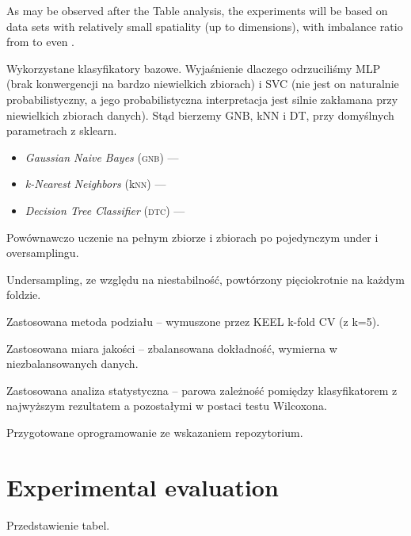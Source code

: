 \documentclass[pmlr]{jmlr}
\begin{document}
As may be observed after the Table analysis, the experiments will be based on data sets with relatively small spatiality (up to  dimensions), with imbalance ratio from  to even .

Wykorzystane klasyfikatory bazowe. Wyjaśnienie dlaczego odrzuciliśmy MLP (brak konwergencji na bardzo niewielkich zbiorach) i SVC (nie jest on naturalnie probabilistyczny, a jego probabilistyczna interpretacja jest silnie zakłamana przy niewielkich zbiorach danych). Stąd bierzemy GNB, kNN i DT, przy domyślnych parametrach z sklearn.

\begin{itemize}
	\item \emph{Gaussian Naive Bayes} (\textsc{gnb}) ---
	\item \emph{k-Nearest Neighbors} (k\textsc{nn}) ---
	\item \emph{Decision Tree Classifier} (\textsc{dtc}) ---
\end{itemize}

Powównawczo uczenie na pełnym zbiorze i zbiorach po pojedynczym under i oversamplingu.

Undersampling, ze względu na niestabilność, powtórzony pięciokrotnie na każdym foldzie.

Zastosowana metoda podziału -- wymuszone przez KEEL k-fold CV (z k=5). 

Zastosowana miara jakości -- zbalansowana dokładność, wymierna w niezbalansowanych danych.

Zastosowana analiza statystyczna -- parowa zależność pomiędzy klasyfikatorem z najwyższym rezultatem a pozostałymi w postaci testu Wilcoxona.

Przygotowane oprogramowanie ze wskazaniem repozytorium.

\section{Experimental evaluation}
\label{sec:intro}

Przedstawienie tabel.

\begin{table}
\end{table}

\begin{table}
\end{table}

\begin{table}
\end{table}
\end{document}
